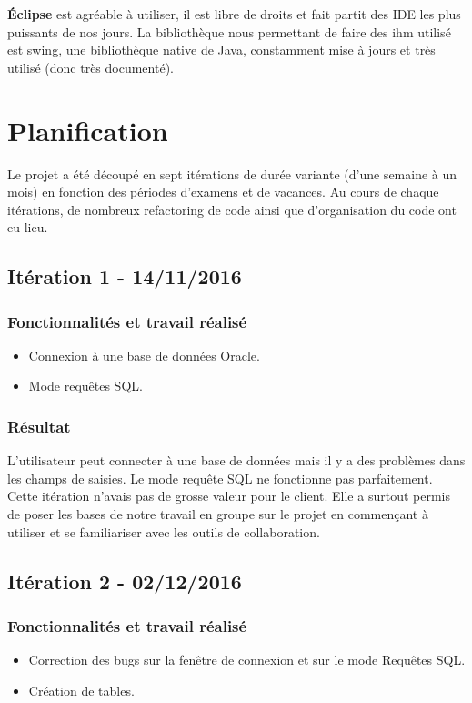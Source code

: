 \textbf{Éclipse} est agréable à utiliser, il est libre de droits et fait partit des IDE les plus puissants de nos jours.
La bibliothèque nous permettant de faire des \gls{ihm} utilisé est swing, une bibliothèque native de Java, constamment mise à jours et très utilisé (donc très documenté).

\section{Planification}
Le projet a été découpé en sept itérations de durée variante (d'une semaine à un mois) en fonction des périodes d'examens et de vacances. Au cours de chaque itérations, de nombreux refactoring de code ainsi que d'organisation du code ont eu lieu.


\subsection{Itération 1 - 14/11/2016}

\subsubsection{Fonctionnalités et travail réalisé}
\begin{itemize}
\item Connexion à une base de données Oracle.
\item Mode requêtes SQL.
\end{itemize}

\subsubsection{Résultat}
L'utilisateur peut connecter à une base de données mais il y a des problèmes dans les champs de saisies. Le mode requête SQL ne fonctionne pas parfaitement.
Cette itération n'avais pas de grosse valeur pour le client. Elle a surtout permis de poser les bases de notre travail en groupe sur le projet en commençant à utiliser et se familiariser avec les outils de collaboration.


\subsection{Itération 2 - 02/12/2016}
\subsubsection{Fonctionnalités et travail réalisé}
\begin{itemize}
\item Correction des bugs sur la fenêtre de connexion et sur le mode Requêtes SQL.
\item Création de tables.
\end{itemize}

